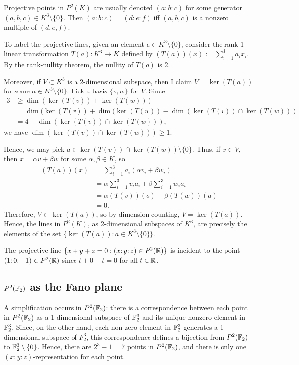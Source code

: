 \documentclass{article}
\begin{document}
Projective points in $P^2(K)$ are usually denoted $(a\mathpunct{:} b \mathpunct{:} c)$ for some generator $(a,b,c) \in K^3\setminus \{0\}$. Then $(a\mathpunct{:}b\mathpunct{:}c) = (d\mathpunct{:}e\mathpunct{:}f)$ iff $(a,b,c)$ is a nonzero multiple of $(d,e,f)$. 

To label the projective lines, given an element $a \in K^3\setminus \{0\}$, consider the rank-1 linear transformation $T(a):K^3 \to K$ defined by $(T(a))(x) := \sum_{i=1}^3 a_ix_i$.  By the rank-nullity theorem, the nullity of $T(a)$ is 2. 

Moreover, if $V \subset K^3$ is a 2-dimensional subspace, then I claim $V = \ker(T(a))$ for some $a \in K^3\setminus \{0\}$.   Pick a basis $\{v, w\}$ for $V$. 
Since 
\begin{align*}
3 & \ge \dim(\ker(T(v)) + \ker(T(w))) 
\\ & = \dim(\ker(T(v)) + \dim(\ker(T(w)) - \dim(\ker(T(v)) \cap \ker(T(w)))  
\\ & = 4 - \dim(\ker(T(v)) \cap \ker(T(w))),
\end{align*}
 we have $\dim(\ker(T(v)) \cap \ker(T(w))) \ge 1$.

Hence, we may pick $a \in \ker(T(v)) \cap \ker(T(w)) \setminus \{0\}$.
Thus, if $x \in V$, then $x = \alpha v + \beta w$ for some $\alpha, \beta \in K$, so
\begin{align*}
(T(a))(x) & = \sum_{i=1}^3 a_i(\alpha v_i + \beta w_i)
\\ &  = \alpha \sum_{i=1}^3  v_i a_i + \beta \sum_{i=1}^3 w_i a_i 
\\ & = \alpha (T(v))(a) + \beta (T(w))(a) 
\\ & = 0.
\end{align*}
Therefore, $V \subset \ker(T(a))$, so by dimension counting, $V = \ker(T(a))$. Hence, the lines in $P^2(K)$, as 2-dimensional subspaces of $K^3$, are precisely the elements of the set $\{\ker(T(a)) : a \in K^3\setminus\{0\} \}$.

\begin{example}
The projective line $\{x+y+z=0: (x \mathpunct{:}y\mathpunct{:}z) \in P^2(\mathbb{R})\}$ is incident to the point $(1\mathpunct{:}0\mathpunct{:}-1) \in P^2(\mathbb{R})$ since $t+0-t = 0$ for all $t\in \mathbb{R}$.
\end{example}

\subsection{$P^2(\mathbb{F}_2)$ as the Fano plane}
A simplification occurs in $P^2(\mathbb{F}_2)$: there is a correspondence between each point in $P^2(\mathbb{F}_2)$ as a 1-dimensional subspace of $\mathbb{F}_2^3$ and its unique nonzero element in $\mathbb{F}_2^3$. Since, on the other hand, each non-zero element in $\mathbb{F}_2^3$ generates a 1-dimensional subspace of $F_2^3$, this correspondence defines a bijection from $P^2(\mathbb{F}_2)$ to $\mathbb{F}_2^3\setminus \{0\}$. Hence, there are $2^3 - 1 = 7$ points in $P^2(\mathbb{F}_2)$, and there is only one $(x \mathpunct{:}y\mathpunct{:}z)$-representation for each point.
\end{document}
